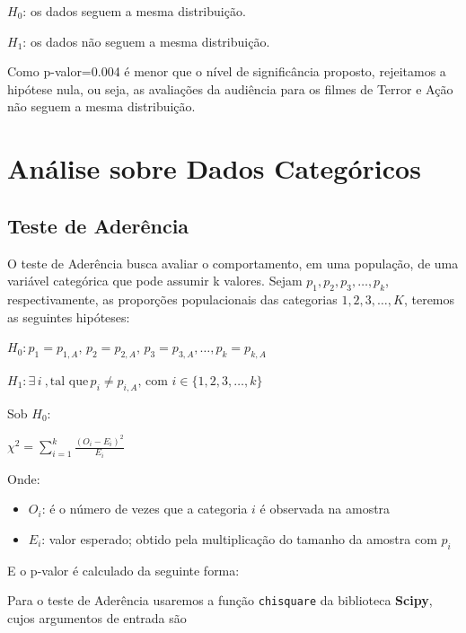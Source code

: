 \documentclass[
  letterpaper,
  DIV=11,
  numbers=noendperiod]{scrreprt}
\providecommand{\tightlist}{%
  \setlength{\itemsep}{0pt}\setlength{\parskip}{0pt}}\usepackage{longtable,booktabs,array}
\begin{document}
\(H_{0}\): os dados seguem a mesma distribuição.

\(H_{1}\): os dados não seguem a mesma distribuição.

Como p-valor=0.004 é menor que o nível de significância proposto,
rejeitamos a hipótese nula, ou seja, as avaliações da audiência para os
filmes de Terror e Ação não seguem a mesma distribuição.


\hypertarget{anuxe1lise-sobre-dados-categuxf3ricos}{%
\chapter{Análise sobre Dados
Categóricos}\label{anuxe1lise-sobre-dados-categuxf3ricos}}

\hypertarget{teste-de-aderuxeancia}{%
\section{Teste de Aderência}\label{teste-de-aderuxeancia}}

O teste de Aderência busca avaliar o comportamento, em uma população, de
uma variável categórica que pode assumir k valores. Sejam
\(p_{1}, p_{2}, p_{3},…, p_{k}\), respectivamente, as proporções
populacionais das categorias \(1, 2, 3, …, K\), teremos as seguintes
hipóteses:

\(H_0: p_1 = p_{1,A}, \, p_2 = p_{2,A}, \, p_3 = p_{3,A}, \dots, p_k = p_{k,A}\)

\(H_1: \exists \, i \ , \text{tal que} \, p_i \neq p_{i,A}, \, \text{com } i \in \{1, 2, 3, \dots, k\}\)

Sob \(H_{0}\):

\(\chi^2 = \displaystyle\sum_{i=1}^k \frac{(O_i - E_i)^2}{E_i}\)

Onde:

\begin{itemize}
\tightlist
\item
  \(O_{i}\): é o número de vezes que a categoria \(i\) é observada na
  amostra
\item
  \(E_{i}\): valor esperado; obtido pela multiplicação do tamanho da
  amostra com \(p_{i}\)
\end{itemize}

E o p-valor é calculado da seguinte forma:

Para o teste de Aderência usaremos a função \texttt{chisquare} da
biblioteca \textbf{Scipy}, cujos argumentos de entrada são
\end{document}
